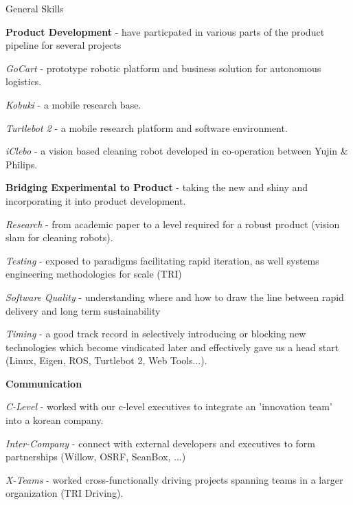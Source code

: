 \documentclass[a4paper,10pt]{article}
\begin{document}
\begin{cvsection}{General Skills}
 \raggedright
  \begin{djs_itemize}
    \item \textbf{Product Development} - have particpated in various parts of the product pipeline for several projects
    \begin{djs_itemize}
      \item \textit{GoCart} - prototype robotic platform and business solution for autonomous logistics.
      \item \textit{Kobuki} - a mobile research base.
      \item \textit{Turtlebot 2} - a mobile research platform and software environment.
      \item \textit{iClebo} - a vision based cleaning robot developed in co-operation between Yujin \& Philips.
    \end{djs_itemize}
    \item \textbf{Bridging Experimental to Product} - taking the new and shiny and incorporating it into product development.
    \begin{djs_itemize}
      \item \textit{Research} - from academic paper to a level required for a robust product (vision slam for cleaning robots).
      \item \textit{Testing} - exposed to paradigms facilitating rapid iteration, as well systems engineering methodologies for scale (TRI)
      \item \textit{Software Quality} - understanding where and how to draw the line between rapid delivery and long term sustainability
      \item \textit{Timing} - a good track record in selectively introducing or blocking new technologies which become vindicated later and effectively gave us a head start (Linux, Eigen, ROS, Turtlebot 2, Web Tools...).
    \end{djs_itemize}
    \item \textbf{Communication}
    \begin{djs_itemize}
      \item \textit{C-Level} - worked with our c-level executives to integrate an 'innovation team' into a korean company.
      \item \textit{Inter-Company} - connect with external developers and executives to form partnerships (Willow, OSRF, ScanBox, ...)
      \item \textit{X-Teams} - worked cross-functionally driving projects spanning teams in a larger organization (TRI Driving). 

\end{djs_itemize}
\end{djs_itemize}
\end{cvsection}
\end{document}
